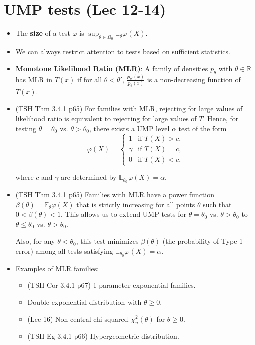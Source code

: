 \documentclass[twoside]{article}
\newcommand\bbE{\mathbb{E}}
\newcommand\bbR{\mathbb{R}}
\newcommand\Om{\Omega}
\def\t{\theta}
\begin{document}
\section*{UMP tests (Lec 12-14)}
\begin{itemize}
\item The \textbf{size} of a test $\varphi$ is $\displaystyle\sup_{\t \in \Om_0} \bbE_\t \varphi(X)$.

\item We can always restrict attention to tests based on sufficient statistics.

\item \textbf{Monotone Likelihood Ratio (MLR)}: A family of densities $p_\t$ with $\t \in \bbR$ has MLR in $T(x)$ if for all $\t < \t'$, $\displaystyle\frac{p_{\t'}(x)}{p_{\t}(x)}$ is a non-decreasing function of $T(x)$.

\item (TSH Thm 3.4.1 p65) For families with MLR, rejecting for large values of likelihood ratio is equivalent to rejecting for large values of $T$. Hence, for testing $\t = \t_0$ vs. $\t > \t_0$, there exists a UMP level $\alpha$ test of the form
\begin{equation*} \varphi(X) = \begin{cases} 1 &\text{if } T(X) > c, \\ 
\gamma &\text{if } T(X) = c, \\
0 &\text{if } T(X) < c,
\end{cases}  \end{equation*}

where $c$ and $\gamma$ are determined by $\bbE_{\t_0} \varphi(X) = \alpha$.

\item (TSH Thm 3.4.1 p65) Families with MLR have a power function $\beta(\t) = \bbE_\t \varphi(X)$ that is strictly increasing for all points $\t$ such that $0 < \beta(\t) < 1$. This allows us to extend UMP tests for $\t = \t_0$ vs. $\t > \t_0$ to $\t \leq \t_0$ vs. $\t > \t_0$.

Also, for any $\t < \t_0$, this test minimizes $\beta(\t)$ (the probability of Type 1 error) among all tests satisfying $\bbE_{\t_0} \varphi(X) = \alpha$.

\item Examples of MLR families:
\begin{itemize}
\item (TSH Cor 3.4.1 p67) 1-parameter exponential families.
\item Double exponential distribution with $\t \geq 0$.
\item (Lec 16) Non-central chi-squared $\chi_n^2(\t)$ for $\t \geq 0$.
\item (TSH Eg 3.4.1 p66) Hypergeometric distribution.
\end{itemize}


\end{itemize}
\end{document}
